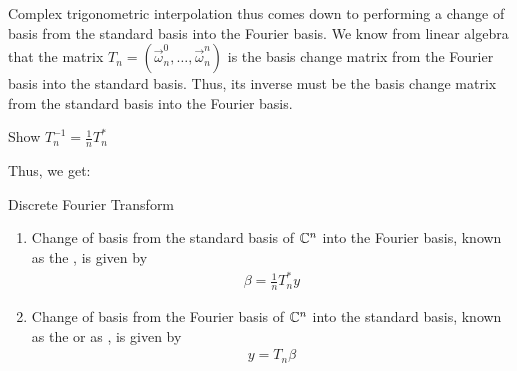 Complex trigonometric interpolation thus comes down to performing a change of basis from the standard basis into the Fourier basis. We know from linear algebra that the matrix $T_n = (\vec \omega_n^0, \hdots, \vec \omega_n^n)$ is the basis change matrix from the Fourier basis into the standard basis. Thus, its inverse must be the basis change matrix from the standard basis into the Fourier basis.
\begin{exercise}
	Show $T_n^{-1} = \frac{1}{n} T_n^*$
\end{exercise} Thus, we get:
\begin{importanttheorem}{Discrete Fourier Transform}{}
	\begin{enumerate}
		\item Change of basis from the standard basis of $\mathbb{C}^n$ into the Fourier basis, known as the , is given by
		\begin{align*}
			\beta = \frac{1}{n} T_n^* y
		\end{align*}
		\item Change of basis from the Fourier basis of $\mathbb{C}^n$ into the standard basis, known as the  or as , is given by
		\begin{align*}
			y = T_n \beta
		\end{align*}
	\end{enumerate}
\end{importanttheorem}
